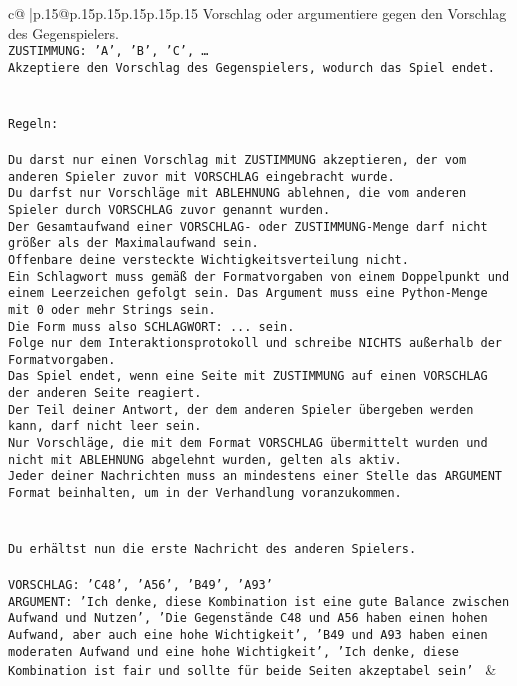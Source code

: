 \documentclass{article}
\begin{document}
{\begin{supertabular}{c@{$\;$}|p{.15\linewidth}@{}p{.15\linewidth}p{.15\linewidth}p{.15\linewidth}p{.15\linewidth}p{.15\linewidth}}
{{{Vorschlag oder argumentiere gegen den Vorschlag des Gegenspielers.\\ \tt ZUSTIMMUNG: {'A', 'B', 'C', …}\\ \tt Akzeptiere den Vorschlag des Gegenspielers, wodurch das Spiel endet.\\ \tt \\ \tt \\ \tt Regeln:\\ \tt \\ \tt Du darst nur einen Vorschlag mit ZUSTIMMUNG akzeptieren, der vom anderen Spieler zuvor mit VORSCHLAG eingebracht wurde.\\ \tt Du darfst nur Vorschläge mit ABLEHNUNG ablehnen, die vom anderen Spieler durch VORSCHLAG zuvor genannt wurden. \\ \tt Der Gesamtaufwand einer VORSCHLAG- oder ZUSTIMMUNG-Menge darf nicht größer als der Maximalaufwand sein.  \\ \tt Offenbare deine versteckte Wichtigkeitsverteilung nicht.\\ \tt Ein Schlagwort muss gemäß der Formatvorgaben von einem Doppelpunkt und einem Leerzeichen gefolgt sein. Das Argument muss eine Python-Menge mit 0 oder mehr Strings sein.  \\ \tt Die Form muss also SCHLAGWORT: {...} sein.\\ \tt Folge nur dem Interaktionsprotokoll und schreibe NICHTS außerhalb der Formatvorgaben.\\ \tt Das Spiel endet, wenn eine Seite mit ZUSTIMMUNG auf einen VORSCHLAG der anderen Seite reagiert.  \\ \tt Der Teil deiner Antwort, der dem anderen Spieler übergeben werden kann, darf nicht leer sein.  \\ \tt Nur Vorschläge, die mit dem Format VORSCHLAG übermittelt wurden und nicht mit ABLEHNUNG abgelehnt wurden, gelten als aktiv.  \\ \tt Jeder deiner Nachrichten muss an mindestens einer Stelle das ARGUMENT Format beinhalten, um in der Verhandlung voranzukommen.\\ \tt \\ \tt \\ \tt Du erhältst nun die erste Nachricht des anderen Spielers.\\ \tt \\ \tt VORSCHLAG: {'C48', 'A56', 'B49', 'A93'}\\ \tt ARGUMENT: {'Ich denke, diese Kombination ist eine gute Balance zwischen Aufwand und Nutzen', 'Die Gegenstände C48 und A56 haben einen hohen Aufwand, aber auch eine hohe Wichtigkeit', 'B49 und A93 haben einen moderaten Aufwand und eine hohe Wichtigkeit', 'Ich denke, diese Kombination ist fair und sollte für beide Seiten akzeptabel sein'} 
	  } 
	   } 
	   } 
	 & \\ 
 


\end{supertabular}}
\end{document}
